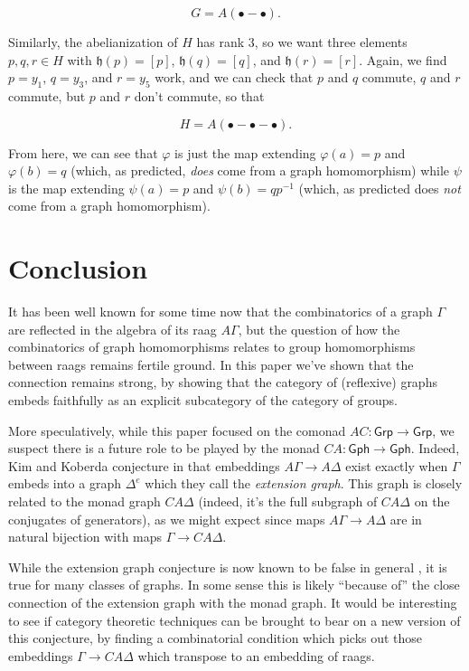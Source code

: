 \documentclass[microtype]{gtpart}
\theoremstyle{definition}
\theoremstyle{theorem}
\newcommand*{\catFont}[1]{\mathsf{#1}}
\newcommand{\Grp}{\catFont{Grp}}
\begin{document}
\[ G = A(\bullet - \bullet) .\]

Similarly, the abelianization of $H$ has rank $3$, so we want three elements 
$p,q,r \in H$ with $\mathfrak{h}(p) = [p]$, $\mathfrak{h}(q) = [q]$, and 
$\mathfrak{h}(r) = [r]$. Again, we find $p = y_1$, $q = y_3$, and $r = y_5$ 
work, and we can check that $p$ and $q$ commute, $q$ and $r$ commute, but 
$p$ and $r$ don't commute, so that 

\[ H = A(\bullet - \bullet - \bullet) .\]

From here, we can see that $\varphi$ is just the map extending
$\varphi(a)=p$ and $\varphi(b)=q$ 
(which, as predicted, \emph{does} come from a graph homomorphism) while 
$\psi$ is the map extending $\psi(a)=p$ and $\psi(b)=qp^{-1}$ 
(which, as predicted does \emph{not} come from a graph homomorphism).

\section{Conclusion}
\label{conclusion}

It has been well known for some time now that the combinatorics of a graph
$\Gamma$ are reflected in the algebra of its raag $A\Gamma$, but the 
question of how the combinatorics of graph homomorphisms relates to 
group homomorphisms between raags remains fertile ground. In this paper we've 
shown that the connection remains strong, by showing that the category of
(reflexive) graphs embeds faithfully as an explicit subcategory of 
the category of groups. 

More speculatively, while this paper focused on the comonad $AC : \Grp \to \Grp$,
we suspect there is a future role to be played by the monad 
$CA : \mathsf{Gph} \to \mathsf{Gph}$. Indeed, Kim and Koberda conjecture 
in \cite{kimEmbedabilityRightangledArtin2013} that embeddings 
$A\Gamma \to A \Delta$ exist exactly when $\Gamma$ embeds into a 
graph $\Delta^e$ which they call the \emph{extension graph}.
This graph is closely related to the monad graph $CA\Delta$ 
(indeed, it's the full subgraph of $CA\Delta$ on the conjugates of generators), 
as we might expect since maps $A\Gamma \to A \Delta$ are in natural 
bijection with maps $\Gamma \to CA \Delta$. 

While the extension graph conjecture is now known to be false in general
\cite{casals-ruizEmbedddingsPartiallyCommutative2013}, it is true for 
many classes of graphs. In some sense this is likely ``because of'' the close 
connection of the extension graph with the monad graph. It would be interesting 
to see if category theoretic techniques can be brought to bear on a new version 
of this conjecture, by finding a combinatorial condition which picks out those 
embeddings $\Gamma \to CA \Delta$ which transpose to an embedding of raags.
\end{document}
